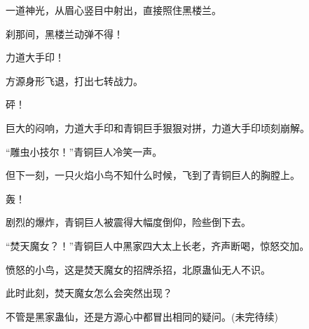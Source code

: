 \begin{this_body}
一道神光，从眉心竖目中射出，直接照住黑楼兰。

刹那间，黑楼兰动弹不得！

力道大手印！

方源身形飞退，打出七转战力。

砰！

巨大的闷响，力道大手印和青铜巨手狠狠对拼，力道大手印顷刻崩解。

“雕虫小技尔！”青铜巨人冷笑一声。

但下一刻，一只火焰小鸟不知什么时候，飞到了青铜巨人的胸膛上。

轰！

剧烈的爆炸，青铜巨人被震得大幅度倒仰，险些倒下去。

“焚天魔女？！”青铜巨人中黑家四大太上长老，齐声断喝，惊怒交加。

愤怒的小鸟，这是焚天魔女的招牌杀招，北原蛊仙无人不识。

此时此刻，焚天魔女怎么会突然出现？

不管是黑家蛊仙，还是方源心中都冒出相同的疑问。(未完待续)

\end{this_body}

